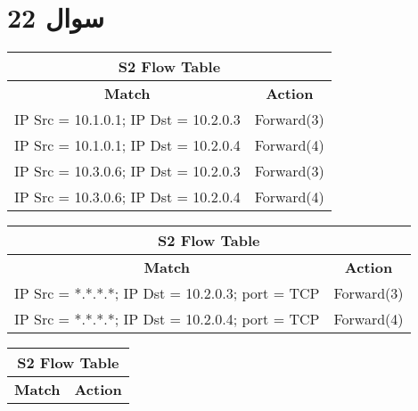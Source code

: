\documentclass{article}
\begin{document}
\section{سوال 22}
\begin{latin}
\begin{table}[H]
\begin{tabular}{|lc|}
\hline
\multicolumn{2}{|c|}{\textbf{S2 Flow Table}}                                                 \\ \hline
\multicolumn{1}{|c|}{\textbf{Match}}                       & \textbf{Action}                 \\ \hline
\multicolumn{1}{|l|}{IP Src = 10.1.0.1; IP Dst = 10.2.0.3} & \multicolumn{1}{l|}{Forward(3)} \\ \hline
\multicolumn{1}{|l|}{IP Src = 10.1.0.1; IP Dst = 10.2.0.4} & Forward(4)                      \\ \hline
\multicolumn{1}{|l|}{IP Src = 10.3.0.6; IP Dst = 10.2.0.3} & Forward(3)                      \\ \hline
\multicolumn{1}{|l|}{IP Src = 10.3.0.6; IP Dst = 10.2.0.4} & \multicolumn{1}{l|}{Forward(4)} \\ \hline
\end{tabular}
\end{table}
\begin{table}[H]
\begin{tabular}{|lc|}
\hline
\multicolumn{2}{|c|}{\textbf{S2 Flow Table}}                                                            \\ \hline
\multicolumn{1}{|c|}{\textbf{Match}}                                  & \textbf{Action}                 \\ \hline
\multicolumn{1}{|l|}{IP Src = *.*.*.*; IP Dst = 10.2.0.3; port = TCP} & \multicolumn{1}{l|}{Forward(3)} \\ \hline
\multicolumn{1}{|l|}{IP Src = *.*.*.*; IP Dst = 10.2.0.4; port = TCP} & Forward(4)                      \\ \hline
\end{tabular}
\end{table}
\begin{table}[H]
\begin{tabular}{|cl|}
\hline
\multicolumn{2}{|c|}{\textbf{S2 Flow Table}}                                                     \\ \hline
\multicolumn{1}{|c|}{\textbf{Match}}                      & \multicolumn{1}{c|}{\textbf{Action}} \\ \hline

\end{tabular}
\end{table}
\end{latin}
\end{document}
